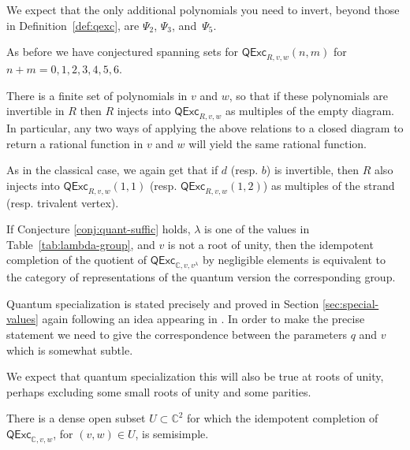 \documentclass[12pt]{amsart}
\begin{document}
We expect that the only additional polynomials you need to invert,
beyond those in Definition~\ref{def:qexc}, are $\Psi_2$, $\Psi_3$, and~$\Psi_5$.

As before we have conjectured spanning sets for $\mathsf{QExc}_{R,v,w}(n,m)$
for $n+m=0,1,2,3,4,5,6$.

\begin{conjecture}
  \label{conj:quant-consist}
There is a finite set of polynomials in $v$ and $w$, so that if these
polynomials are invertible in $R$ then $R$ injects into
$\mathsf{QExc}_{R,v,w}$ as multiples of the empty diagram.  In particular, any
two ways of applying the above relations to a closed diagram to return a
rational function in $v$ and $w$ will yield the same rational function.
\end{conjecture}

As in the classical case, we again get that if $d$ (resp. $b$) is invertible,
then $R$ also injects into $\mathsf{QExc}_{R,v,w}(1,1)$ (resp.
$\mathsf{QExc}_{R,v,w}(1,2)$) as multiples of the strand (resp. trivalent
vertex).

\begin{proposition}\label{prop:quant-spec}
  If Conjecture \ref{conj:quant-suffic} holds, $\lambda$ is one of
  the values in Table~\ref{tab:lambda-group},
  and $v$ is not a root of unity, then the idempotent completion of
  the quotient of
$\mathsf{QExc}_{\mathbb{C},v,v^\lambda}$ by negligible elements is
equivalent to the category of representations of the quantum version
the corresponding group.
\end{proposition}

Quantum specialization is stated precisely and proved in Section 
\ref{sec:special-values} again following an idea appearing in \cite{1709.01278}. 
In order to make the precise statement we need to give the correspondence
between the parameters $q$ and $v$ which is somewhat subtle.

We expect that quantum specialization this will also be true at roots of unity, 
perhaps excluding some small roots of unity and some parities.


\begin{conjecture}
There is a dense open subset $U \subset \mathbb{C}^2$ for which the idempotent
completion of $\mathsf{QExc}_{\mathbb{C},v,w}$, for $(v,w) \in U$, is
semisimple.
\end{conjecture}
\end{document}
